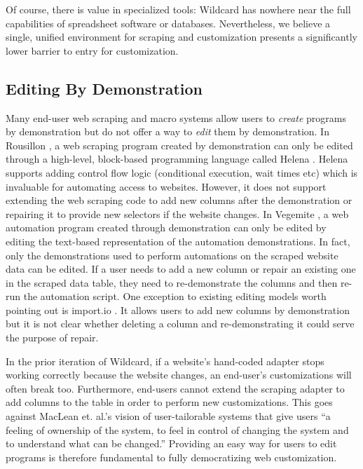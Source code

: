 \documentclass[sigconf,10pt]{acmart}
\begin{document}
Of course, there is value in specialized tools: Wildcard has nowhere
near the full capabilities of spreadsheet software or databases.
Nevertheless, we believe a single, unified environment for scraping and
customization presents a significantly lower barrier to entry for
customization.

\hypertarget{editing-by-demonstration-1}{%
\subsection{Editing By Demonstration}\label{editing-by-demonstration-1}}

Many end-user web scraping and macro systems allow users to
\emph{create} programs by demonstration but do not offer a way to
\emph{edit} them by demonstration. In Rousillon \citep{chasins2018}, a
web scraping program created by demonstration can only be edited through
a high-level, block-based programming language called Helena
\citep{zotero-51}. Helena supports adding control flow logic
(conditional execution, wait times etc) which is invaluable for
automating access to websites. However, it does not support extending
the web scraping code to add new columns after the demonstration or
repairing it to provide new selectors if the website changes. In
Vegemite \citep{lin2009}, a web automation program created through
demonstration can only be edited by editing the text-based
representation of the automation demonstrations. In fact, only the
demonstrations used to perform automations on the scraped website data
can be edited. If a user needs to add a new column or repair an existing
one in the scraped data table, they need to re-demonstrate the columns
and then re-run the automation script. One exception to existing editing
models worth pointing out is import.io \citep{import.io}. It allows
users to add new columns by demonstration but it is not clear whether
deleting a column and re-demonstrating it could serve the purpose of
repair.

In the prior iteration of Wildcard, if a website's hand-coded adapter
stops working correctly because the website changes, an end-user's
customizations will often break too. Furthermore, end-users cannot
extend the scraping adapter to add columns to the table in order to
perform new customizations. This goes against MacLean et. al.'s vision
of user-tailorable systems \citep{maclean1990} that give users ``a
feeling of ownership of the system, to feel in control of changing the
system and to understand what can be changed.'' Providing an easy way
for users to edit programs is therefore fundamental to fully
democratizing web customization.
\end{document}
